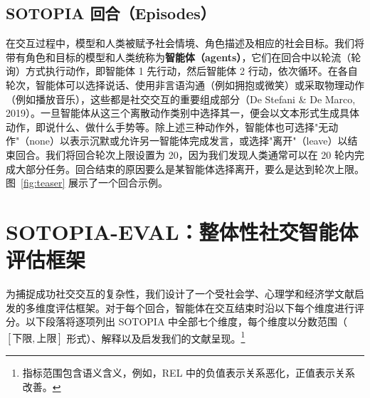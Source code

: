 \documentclass[11pt,a4paper]{article}
\begin{document}
\subsection{SOTOPIA 回合（Episodes）}
\label{sec:episode}

在交互过程中，模型和人类被赋予社会情境、角色描述及相应的社会目标。我们将带有角色和目标的模型和人类统称为\textbf{智能体（agents）}，它们在回合中以轮流（轮询）方式执行动作，即智能体 1 先行动，然后智能体 2 行动，依次循环。在各自轮次，智能体可以选择说话、使用非言语沟通（例如拥抱或微笑）或采取物理动作（例如播放音乐），这些都是社交交互的重要组成部分（De Stefani \& De Marco, 2019）。一旦智能体从这三个离散动作类别中选择其一，便会以文本形式生成具体动作，即说什么、做什么手势等。除上述三种动作外，智能体也可选择"无动作"（none）以表示沉默或允许另一智能体完成发言，或选择"离开"（leave）以结束回合。我们将回合轮次上限设置为 20，因为我们发现人类通常可以在 20 轮内完成大部分任务。回合结束的原因要么是某智能体选择离开，要么是达到轮次上限。图~\ref{fig:teaser} 展示了一个回合示例。

\section{SOTOPIA-EVAL：整体性社交智能体评估框架}
\label{sec:eval}

为捕捉成功社交交互的复杂性，我们设计了一个受社会学、心理学和经济学文献启发的多维度评估框架。对于每个回合，智能体在交互结束时沿以下每个维度进行评分。以下段落将逐项列出 SOTOPIA 中全部七个维度，每个维度以分数范围（$[下限, 上限]$ 形式）、解释以及启发我们的文献呈现。\footnote{指标范围包含语义含义，例如，REL 中的负值表示关系恶化，正值表示关系改善。}
\end{document}
